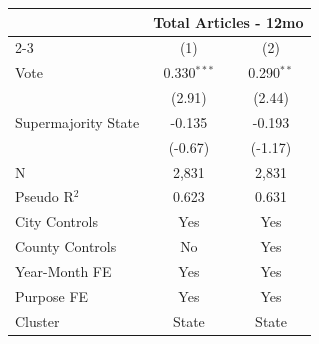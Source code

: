 \begingroup
\centering
\begin{tabular*}{\textwidth}{@{\extracolsep{\fill}}lcc}

\addlinespace
   \toprule
    & \multicolumn{2}{c}{Total Articles - 12mo}\\
   \cmidrule(lr){2-3}
                       & (1)           & (2)\\  
   \midrule 
   Vote                & 0.330$^{***}$ & 0.290$^{**}$\\   
                       & (2.91)       & (2.44)\\   
   Supermajority State & -0.135        & -0.193\\   
                       & (-0.67)      & (-1.17)\\   
   \hline
   N        & 2,831         & 2,831\\  
   Pseudo R$^2$        & 0.623         & 0.631\\  
   City Controls              & Yes           & Yes\\
   County Controls            & No            & Yes\\
   Year-Month FE       & Yes           & Yes\\  
   Purpose FE          & Yes           & Yes\\  
   Cluster              & State & State\\  
   \bottomrule
\end{tabular*}
\par\endgroup
